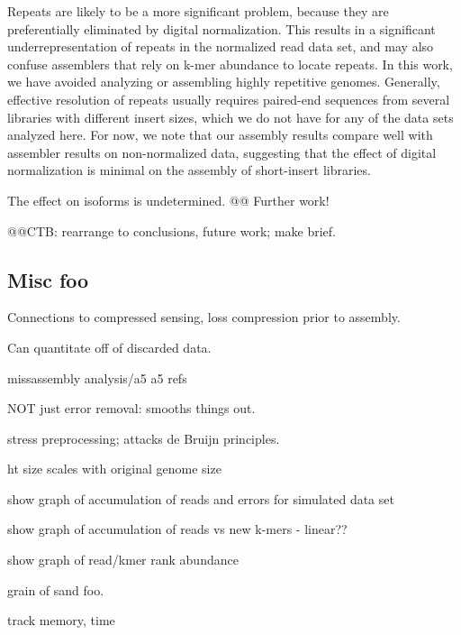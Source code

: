 \documentclass[10pt]{article}
\begin{document}
Repeats are likely to be a more significant problem, because they are
preferentially eliminated by digital normalization.  This results in a
significant underrepresentation of repeats in the normalized read data
set, and may also confuse assemblers that rely on k-mer abundance to
locate repeats.  In this work, we have avoided analyzing or assembling
highly repetitive genomes.  Generally, effective resolution of repeats
usually requires paired-end sequences from several libraries with
different insert sizes, which we do not have for any of the data sets
analyzed here.  For now, we note that our assembly results compare
well with assembler results on non-normalized data, suggesting that
the effect of digital normalization is minimal on the assembly of
short-insert libraries.

The effect on isoforms is undetermined.  @@  Further work!

@@CTB: rearrange to conclusions, future work; make brief.

\subsection*{Misc foo}

Connections to compressed sensing, loss compression prior to assembly.

Can quantitate off of discarded data.





missassembly analysis/a5
a5 refs

NOT just error removal: smooths things out.

stress preprocessing; attacks de Bruijn principles.

ht size scales with original genome size

show graph of accumulation of reads and errors for simulated data set

show graph of accumulation of reads vs new k-mers - linear??

show graph of read/kmer rank abundance

grain of sand foo.


track memory, time
\end{document}
